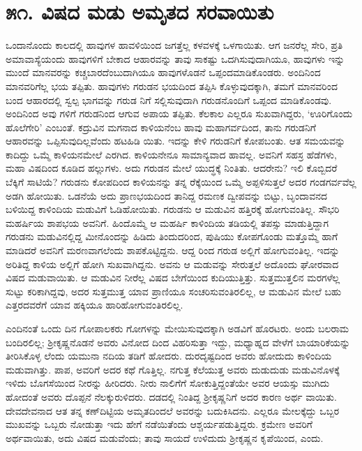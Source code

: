 
\chapter{೫೧. ವಿಷದ ಮಡು ಅಮೃತದ ಸರವಾಯಿತು}

ಒಂದಾನೊಂದು ಕಾಲದಲ್ಲಿ ಹಾವುಗಳ ಹಾವಳಿಯಿಂದ ಜಗತ್ತೆಲ್ಲ ಕಳವಳಕ್ಕೆ ಒಳಗಾಯಿತು. ಆಗ ಜನರೆಲ್ಲ ಸೇರಿ, ಪ್ರತಿ ಅಮಾವಾಸ್ಯೆಯಂದು ಹಾವುಗಳಿಗೆ ಬೇಕಾದ ಆಹಾರವನ್ನು ತಾವು ಸಾಕಷ್ಟು ಒದಗಿಸುವುದಾಗಿಯೂ, ಹಾವುಗಳು ಇನ್ನು ಮುಂದೆ ಮಾನವರನ್ನು ಕಚ್ಚಬಾರದೆಂಬುದಾಗಿಯೂ ಹಾವುಗಳೊಡನೆ ಒಪ್ಪಂದಮಾಡಿಕೊಂಡರು. ಅಂದಿನಿಂದ ಮಾನವರಿಗೆಲ್ಲ ಭಯ ತಪ್ಪಿತು. ಹಾವುಗಳು ಗರುಡನ ಭಯದಿಂದ ತಪ್ಪಿಸಿ ಕೊಳ್ಳುವುದಕ್ಕಾಗಿ, ತಮಗೆ ಮಾನವರಿಂದ ಬಂದ ಆಹಾರದಲ್ಲಿ ಸ್ವಲ್ಪ ಭಾಗವನ್ನು ಗರುಡ ನಿಗೆ ಸಲ್ಲಿಸುವುದಾಗಿ ಗರುಡನೊಂದಿಗೆ ಒಪ್ಪಂದ ಮಾಡಿಕೊಂಡವು. ಅಂದಿನಿಂದ ಅವು ಗಳಿಗೆ ಗರುಡನಿಂದ ಆಗುವ ಅಪಾಯ ತಪ್ಪಿತು. ಕೆಲಕಾಲ ಎಲ್ಲರೂ ಸುಖವಾಗಿದ್ದರು, ‘ಊರಿಗೊಂದು ಹೊಲೆಗೇರಿ’ ಎಂಬಂತೆ. ಕದ್ರುವಿನ ಮಗನಾದ ಕಾಳಿಯನೆಂಬ ಹಾವು ಮಹಾಗರ್ವದಿಂದ, ತಾನು ಗರುಡನಿಗೆ ಆಹಾರವನ್ನು ಒಪ್ಪಿಸುವುದಿಲ್ಲವೆಂದು ಹಟಹಿಡಿ ಯಿತು. ಇದನ್ನು ಕೇಳಿ ಗರುಡನಿಗೆ ಕೋಪಬಂತು. ಆತ ಸಮಯವನ್ನು ಕಾದಿದ್ದು ಒಮ್ಮೆ ಕಾಳಿಯನಮೇಲೆ ಎರಗಿದ. ಕಾಳಿಯನೇನೂ ಸಾಮಾನ್ಯವಾದ ಹಾವಲ್ಲ. ಅವನಿಗೆ ಸಹಸ್ರ ಹೆಡೆಗಳು, ಮಹಾ ವಿಷದಿಂದ ಕೂಡಿದ ಹಲ್ಲುಗಳು. ಅದು ಗರುಡನ ಮೇಲೆ ಯುದ್ಧಕ್ಕೆ ನಿಂತಿತು. ಆದರೇನು? ಇಲಿ ಕೊಬ್ಬಿದರೆ ಬೆಕ್ಕಿಗೆ ಸಾಟಿಯೆ? ಗರುಡನು ಕೋಪದಿಂದ ಕಾಳಿಯನನ್ನು ತನ್ನ ರೆಕ್ಕೆಯಿಂದ ಒಮ್ಮೆ ಅಪ್ಪಳಿಸುತ್ತಲೆ ಅದರ ಗಂಡಗರ್ವವೆಲ್ಲ ಅಡಗಿ ಹೋಯಿತು. ಒಡನೆಯೆ ಅದು ಪ್ರಾಣಭಯದಿಂದ ತಾನಿದ್ದ ರಮಣಕ ದ್ವೀಪವನ್ನು ಬಿಟ್ಟು, ಬೃಂದಾವನದ ಬಳಿಯಿದ್ದ ಕಾಳಿಂದಿಯ ಮಡುವಿಗೆ ಓಡಿಹೋಯಿತು. ಗರುಡನು ಆ ಮಡುವಿನ ಹತ್ತಿರಕ್ಕೆ ಹೋಗುವಂತಿಲ್ಲ. ಸೌಭರಿ ಮಹರ್ಷಿಯ ಶಾಪಭಯ ಅವನಿಗೆ. ಹಿಂದೊಮ್ಮೆ ಆ ಮಹರ್ಷಿ ಕಾಳಿಂದಿಯ ತಡಿಯಲ್ಲಿ ತಪಸ್ಸು ಮಾಡುತ್ತಿದ್ದಾಗ ಗರುಡನು ಮಡುವಿನಲ್ಲಿದ್ದ ಮೀನೊಂದನ್ನು ಹಿಡಿದು ತಿಂದುದರಿಂದ, ಪುಷಿಯು ಕೋಪಗೊಂಡು ಮತ್ತೊಮ್ಮೆ ಹಾಗೆ ಮಾಡಿದರೆ ಅವನಿಗೆ ಮರಣವಾಗಲೆಂದು ಶಾಪಕೊಟ್ಟಿದ್ದನು. ಆದ್ದ ರಿಂದ ಗರುಡ ಅಲ್ಲಿಗೆ ಹೋಗುವಂತಿಲ್ಲ. ಇದನ್ನು ಅರಿತಿದ್ದ ಕಾಳಿಯ ಅಲ್ಲಿಗೆ ಹೋಗಿ ಸುಖವಾಗಿದ್ದನು. ಅವನು ಆ ಮಡುವನ್ನು ಸೇರುತ್ತಲೆ ಅದೊಂದು ಘೋರವಾದ ವಿಷದ ಮಡುವಾಯಿತು. ಆ ಮಡುವಿನ ನೀರೆಲ್ಲ ವಿಷದ ಬೇಗೆಯಿಂದ ಕುದಿಯುತ್ತಿತ್ತು. ಸುತ್ತಮುತ್ತಲಿನ ಮರಗಳೆಲ್ಲ ಸುಟ್ಟು ಕರಿಕಾಗಿದ್ದವು, ಅದರ ಸುತ್ತಮುತ್ತ ಯಾವ ಪ್ರಾಣಿಯೂ ಸಂಚರಿಸುವಂತಿರಲಿಲ್ಲ, ಆ ಮಡುವಿನ ಮೇಲೆ ಬಹು ಎತ್ತರದವರೆಗೆ ಯಾವ ಹಕ್ಕಿಯೂ ಹಾರಿಹೋಗುವಂತಿರಲಿಲ್ಲ.

ಎಂದಿನಂತೆ ಒಂದು ದಿನ ಗೋಪಾಲಕರು ಗೋಗಳನ್ನು ಮೇಯಿಸುವುದಕ್ಕಾಗಿ ಅಡವಿಗೆ ಹೊರಟರು. ಅಂದು ಬಲರಾಮ ಬಂದಿರಲಿಲ್ಲ; ಶ್ರೀಕೃಷ್ಣನೊಡನೆ ಅವರು ವಿನೋದ ದಿಂದ ವಿಹರಿಸುತ್ತಾ ಇದ್ದು, ಮಧ್ಯಾಹ್ನದ ವೇಳೆಗೆ ಬಾಯಾರಿಕೆಯನ್ನು ತೀರಿಸಿಕೊಳ್ಳ ಲೆಂದು ಯಮುನಾ ನದಿಯ ತಡಿಗೆ ಹೋದರು. ದುರದೃಷ್ಟದಿಂದ ಅವರು ಹೋದುದು ಕಾಳಿಂದಿಯ ಮಡುವಾಗಿತ್ತು. ಪಾಪ, ಅವರಿಗೆ ಅದರ ಕಥೆ ಗೊತ್ತಿಲ್ಲ. ನಗುತ್ತ ಕೆಲೆಯುತ್ತ ಅವರು ದುಡುದುಡು ಮಡುವಿನೊಳಕ್ಕೆ ಇಳಿದು ಬೊಗಸೆಯಿಂದ ನೀರನ್ನು ಹೀರಿದರು. ನೀರು ನಾಲಿಗೆಗೆ ಸೋಕುತ್ತಿದ್ದಂತೆಯೇ ಅವರ ಆಯಸ್ಸು ಮುಗಿದು ಹೋದಂತೆ ಅವರು ದೊಪ್ಪನೆ ನೆಲಕ್ಕುರುಳಿದರು. ದಡದಲ್ಲಿ ನಿಂತಿದ್ದ ಶ್ರೀಕೃಷ್ಣನಿಗೆ ಅದರ ಕಾರಣ ಅರ್ಥ ವಾಯಿತು. ದೇವದೇವನಾದ ಆತ ತನ್ನ ಕಣ್​ದಿಟ್ಟಿಯ ಅಮೃತದಿಂದಲೆ ಅವರನ್ನು ಬದುಕಿಸಿದನು. ಎಲ್ಲರೂ ಮೇಲಕ್ಕೆದ್ದು ಒಬ್ಬರ ಮುಖವನ್ನು ಒಬ್ಬರು ನೋಡುತ್ತಾ ಇದು ಹೇಗೆ ನಡೆಯಿತೆಂದು ಆಶ್ಚರ್ಯಪಡುತ್ತಿದ್ದರು. ಕ್ರಮೇಣ ಅವರಿಗೆ ಅರ್ಥವಾಯಿತು, ಅದು ವಿಷದ ಮಡುವೆಂದು; ತಾವು ಸಾಯದೆ ಉಳಿದುದು ಶ್ರೀಕೃಷ್ಣನ ಕೃಪೆಯಿಂದ, ಎಂದು.

